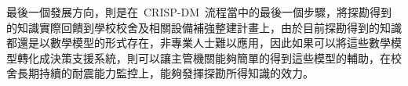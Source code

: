 


最後一個發展方向，則是在~CRISP-DM~流程當中的最後一個步驟，將探勘得到的知識實際回饋到學校校舍及相關設備補強整建計畫上，由於目前探勘得到的知識都還是以數學模型的形式存在，非專業人士難以應用，因此如果可以將這些數學模型轉化成決策支援系統，則可以讓主管機關能夠簡單的得到這些模型的輔助，在校舍長期持續的耐震能力監控上，能夠發揮探勘所得知識的效力。





